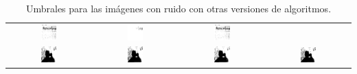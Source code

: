\begin{table}
\begin{tabular}{c||c|c|c}
\includegraphics[width=0.2\textwidth]{img/res/e1a/alg1tipo6-09.jpg} &
\includegraphics[width=0.2\textwidth]{img/res/e1a/alg1tipo6d0.75-09.jpg} &
\includegraphics[width=0.2\textwidth]{img/res/e1a/alg1tipo6d1.25-09.jpg} \\
\includegraphics[width=0.2\textwidth]{img/res/e1a/alg1tipo1-07.jpg} &
\includegraphics[width=0.2\textwidth]{img/res/e1a/alg1tipo6-07.jpg} &
\includegraphics[width=0.2\textwidth]{img/res/e1a/alg1tipo6d0.75-07.jpg} &
\includegraphics[width=0.2\textwidth]{img/res/e1a/alg1tipo6d1.25-07.jpg} \\\hline
\end{tabular}
\caption{Umbrales para las imágenes con ruido con otras versiones de algoritmos.\label{tab:resultexp1imagenesdombi}}
\end{table}



